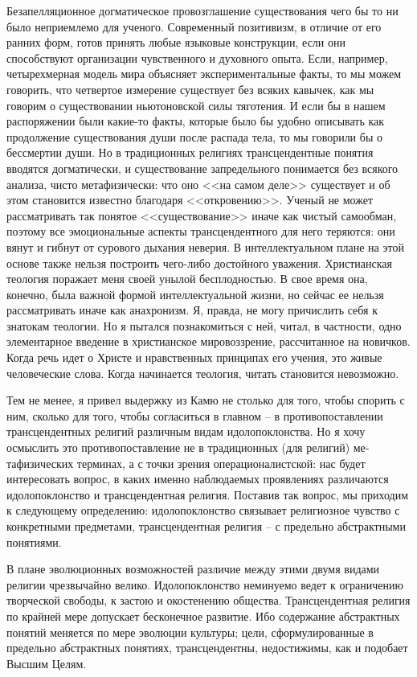 \documentclass{book}
\begin{document}
Безапелляционное догматическое провозглашение существования чего бы то ни было неприемлемо для ученого. Современ­ный позитивизм, в отличие от его ранних форм, готов принять любые языковые конструкции, если они способствуют организации чувственного и духовного опыта. Если, например, четырехмерная модель мира объясняет экспериментальные факты, то мы можем говорить, что четвертое измерение существует без всяких кавычек, как мы говорим о существовании ньютоновской силы тяготения. И если бы в нашем распоряжении были какие-то факты, которые было бы удобно описывать как продолжение существования души после распада тела, то мы говорили бы о бессмертии души. Но в традиционных религиях трансцендентные понятия вводятся догматически, и существование запредельного понимается без всякого анализа, чисто метафизически: что оно <<на самом деле>> существует и об этом становится известно благодаря <<откровению>>. Уче­ный не может рассматривать так понятое <<существование>> иначе как чистый самообман, поэтому все эмоциональные 
ас­пекты трансцендентного для него теряются: они вянут и гибнут от сурового дыхания неверия. В интеллектуальном плане на этой основе также нельзя построить чего-либо достойного уважения. Христианская теология поражает меня своей уны­лой бесплодностью. В свое время она, конечно, была важной формой интеллектуальной жизни, но сейчас ее нельзя рассматривать иначе как анахронизм. Я, правда, не могу причислить себя к знатокам теологии. Но я пытался познакомиться с ней, читал, в частности, одно элементарное введение в христианское мировоззрение, рассчитанное на новичков. Когда речь идет о Христе и нравственных принципах его учения, это живые человеческие слова. Когда начинается теология, читать стано­вится невозможно.

Тем не менее, я привел выдержку из Камю не столько для того, чтобы спорить с ним, сколько для того, чтобы согласиться в главном -- в противопоставлении трансцендентных религий различным видам идолопоклонства. Но я хочу осмыслить это противопоставление не в традиционных (для религий) ме­тафизических терминах, а с точки зрения операционалистской: нас будет интересовать вопрос, в каких именно наблюдаемых проявлениях  различаются идолопоклонство и трансцендент­ная религия. Поставив так вопрос, мы приходим к следующему определению: идолопоклонство связывает религиозное чувст­во с конкретными предметами,  трансцендентная религия -- с предельно абстрактными понятиями. 

В плане эволюционных возможностей различие между этими двумя видами религии чрезвычайно велико. Идолопоклонство неминуемо ведет к ограничению творческой свободы, к застою и окостенению общества. Трансцендентная религия по край­ней мере допускает  бесконечное развитие. Ибо содержание аб­страктных понятий меняется по мере эволюции культуры; це­ли, сформулированные в предельно абстрактных понятиях, трансцендентны, недостижимы, как и подобает Высшим Целям.
\end{document}
